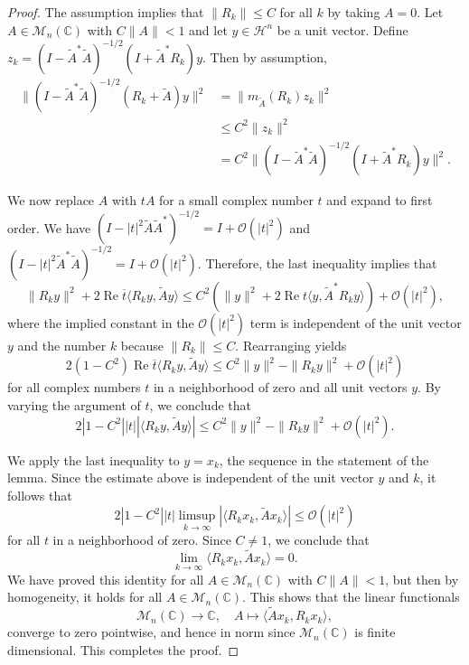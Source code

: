 \documentclass[10pt,a4paper]{amsart}
\renewcommand{\Re}{\operatorname{Re}}
\newcommand\matn{{\mathcal M}_n}
\newcommand\ta{{\tilde{A}}}
\begin{document}
\begin{proof}
  The assumption implies that $\|R_k\| \le C$ for all $k$ by taking $A=0$.
  Let $A \in \matn(\mathbb{C})$ with $C \|A\| < 1$ and let $y \in \mathcal{H}^n$ be a unit vector.
  Define $z_k = (I - \ta^* \ta)^{-1/2} (I + \ta^* R_k) y$.
  Then by assumption,
  \begin{align*}
    \|(I - \ta^* \ta)^{-1/2} (R_k + \ta) y\|^2  &= \|m_\ta(R_k) z_k\|^2 \\ &\le C^2 \|z_k\|^2  \\
                                                        &= C^2 \|(I - \ta^* \ta)^{-1/2} (I + \ta^* R_k) y\|^2.
  \end{align*}

  We now replace $A$ with $t A$ for a small complex number $t$ and expand to first order.
  We have $(I - |t|^2 \ta \ta^*)^{-1/2} = I + \mathcal{O}(|t|^2)$ and $(I - |t|^2 \ta^* \ta)^{-1/2} = I + \mathcal{O}(|t|^2)$.
  Therefore, the last inequality implies that
  \begin{equation*}
    \|R_k y\|^2 + 2 \Re \overline{t} \langle R_k y, \ta y \rangle \le C^2 ( \|y\|^2 + 2 \Re t \langle y, \ta^* R_k y \rangle )
    + \mathcal{O}(|t|^2),
  \end{equation*}
  where the implied constant in the $\mathcal{O}(|t|^2)$ term is independent of the unit vector $y$ and the number $k$
  because $\|R_k\| \le C$.
  Rearranging yields
  \begin{equation*}
 2   (1 - C^2)  \Re \overline{t} \langle R_k y , \ta y \rangle \le C^2 \|y\|^2 - \|R_k y\|^2 + \mathcal{O}(|t|^2)
  \end{equation*}
  for all complex numbers $t$ in a neighborhood of zero and all unit vectors $y$.
  By varying the argument of $t$, we conclude that
  \begin{equation*}
   2 |1 - C^2|  |t| | \langle R_k y , \ta y \rangle| \le C^2 \|y\|^2 - \|R_k y\|^2 + \mathcal{O}(|t|^2).
  \end{equation*}

  We apply the last inequality to $y = x_k$, the sequence in the statement of the lemma. Since the estimate
  above is independent of the unit vector $y$ and $k$, it follows that
  \begin{equation*}
 2   |1 - C^2|  |t| \limsup_{k \to \infty} | \langle R_k x_k , \ta x_k \rangle| \le \mathcal{O}(|t|^2)
  \end{equation*}
  for all $t$ in a neighborhood of zero. Since $C \neq 1$, we conclude that
  \[
    \lim_{k \to \infty} \langle R_k x_k, \ta x_k \rangle = 0.
  \]
  We have proved this identity for all $A \in \matn(\mathbb{C})$ with $ C \|A\| < 1$,
  but then by homogeneity, it holds for all $A \in \matn(\mathbb{C})$. This shows that
  the linear functionals
  \begin{equation*}
    \matn(\mathbb{C}) \to \mathbb{C}, \quad A \mapsto \langle \ta x_k, R_k x_k \rangle,
  \end{equation*}
  converge to zero pointwise, and hence in norm since $\matn(\mathbb{C})$ is finite dimensional. This completes the proof.
\end{proof}
\end{document}
